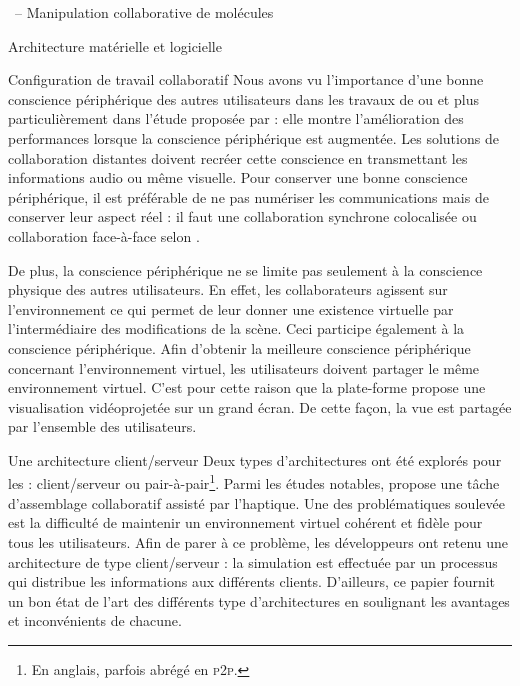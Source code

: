 \documentclass[myfrancais]{mythesis}
\begin{document}
\begin{mychapter}{\myShaddock\ -- Manipulation collaborative de molécules}
\begin{mysection}{Architecture matérielle et logicielle}
\begin{mysubsection}{Configuration de travail collaboratif}
				Nous avons vu l'importance d'une bonne conscience périphérique des autres utilisateurs dans les travaux de  ou  et plus particulièrement dans l'étude proposée par  : elle montre l'amélioration des performances lorsque la conscience périphérique est augmentée.
				Les solutions de collaboration distantes doivent recréer cette conscience en transmettant les informations audio ou même visuelle.
				Pour conserver une bonne conscience périphérique, il est préférable de ne pas numériser les communications mais de conserver leur aspect réel : il faut une collaboration synchrone colocalisée ou collaboration face-à-face selon  .

				De plus, la conscience périphérique ne se limite pas seulement à la conscience physique des autres utilisateurs.
				En effet, les collaborateurs agissent sur l'environnement ce qui permet de leur donner une existence virtuelle par l'intermédiaire des modifications de la scène.
				Ceci participe également à la conscience périphérique.
				Afin d'obtenir la meilleure conscience périphérique concernant l'environnement virtuel, les utilisateurs doivent partager le même environnement virtuel.
				C'est pour cette raison que la plate-forme \myShaddock propose une visualisation vidéoprojetée sur un grand écran.
				De cette façon, la vue est partagée par l'ensemble des utilisateurs.
			\end{mysubsection}
			\begin{mysubsection}{Une architecture client/serveur}
				Deux types d'architectures ont été explorés pour les  : client/serveur ou pair-à-pair\footnote{En anglais,  parfois abrégé en \textsc{p2p}.}.
				Parmi les études notables,  propose une tâche d'assemblage collaboratif assisté par l'haptique.
				Une des problématiques soulevée est la difficulté de maintenir un environnement virtuel cohérent et fidèle pour tous les utilisateurs.
				Afin de parer à ce problème, les développeurs ont retenu une architecture de type client/serveur : la simulation est effectuée par un processus qui distribue les informations aux différents clients.
				D'ailleurs, ce papier fournit un bon état de l'art des différents type d'architectures en soulignant les avantages et inconvénients de chacune.


\end{mysubsection}
\end{mysection}
\end{mychapter}
\end{document}
